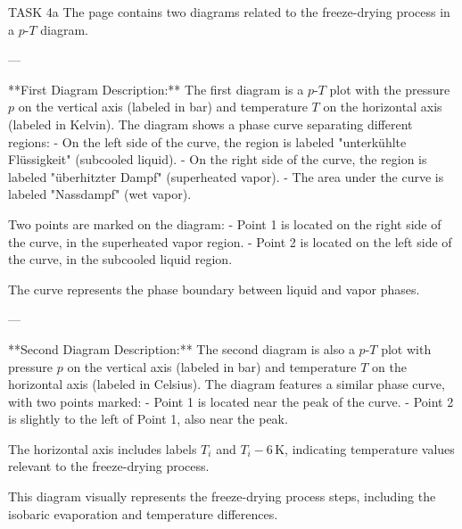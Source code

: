 TASK 4a  
The page contains two diagrams related to the freeze-drying process in a \( p \)-\( T \) diagram.

---

**First Diagram Description:**  
The first diagram is a \( p \)-\( T \) plot with the pressure \( p \) on the vertical axis (labeled in bar) and temperature \( T \) on the horizontal axis (labeled in Kelvin). The diagram shows a phase curve separating different regions:  
- On the left side of the curve, the region is labeled "unterkühlte Flüssigkeit" (subcooled liquid).  
- On the right side of the curve, the region is labeled "überhitzter Dampf" (superheated vapor).  
- The area under the curve is labeled "Nassdampf" (wet vapor).  

Two points are marked on the diagram:  
- Point 1 is located on the right side of the curve, in the superheated vapor region.  
- Point 2 is located on the left side of the curve, in the subcooled liquid region.  

The curve represents the phase boundary between liquid and vapor phases.

---

**Second Diagram Description:**  
The second diagram is also a \( p \)-\( T \) plot with pressure \( p \) on the vertical axis (labeled in bar) and temperature \( T \) on the horizontal axis (labeled in Celsius). The diagram features a similar phase curve, with two points marked:  
- Point 1 is located near the peak of the curve.  
- Point 2 is slightly to the left of Point 1, also near the peak.  

The horizontal axis includes labels \( T_i \) and \( T_i - 6 \, \text{K} \), indicating temperature values relevant to the freeze-drying process.  

This diagram visually represents the freeze-drying process steps, including the isobaric evaporation and temperature differences.